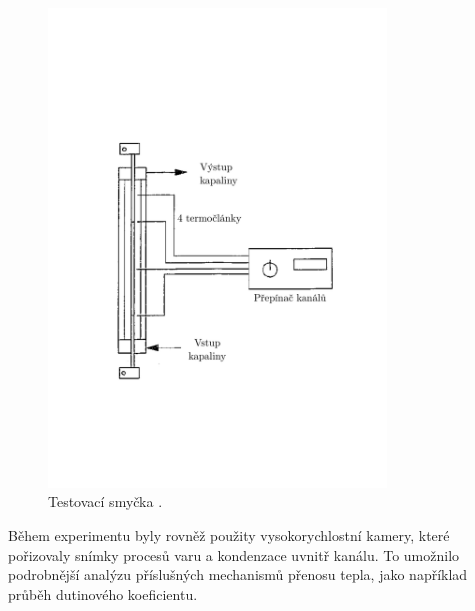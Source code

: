 \begin{figure}
	\centering
	\includegraphics[width=0.8\textwidth, trim={0cm 5cm 0cm 8cm }, clip]{./03_benchmark/obrazky/zeitoun_circuit_translated.pdf}
	\caption{{Testovací smyčka \cite{zeitoun1994subcooled}.}}
	\label{fig:zeitoun_circuit}
\end{figure}


Během experimentu byly rovněž použity vysokorychlostní kamery, které pořizovaly snímky procesů varu a kondenzace uvnitř kanálu. To umožnilo podrobnější analýzu příslušných mechanismů přenosu tepla, jako například průběh dutinového koeficientu.
